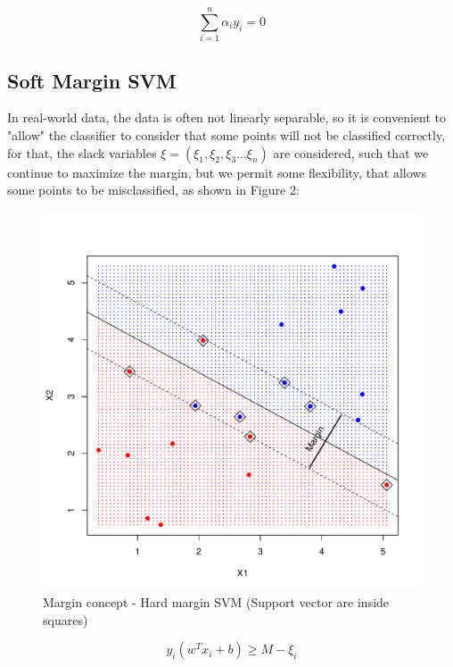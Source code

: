 \documentclass[11pt,twocolumn,letterpaper]{article}
\begin{document}
\begin{equation}
	\sum_{i=1}^{n} \alpha_i y_i = 0
\end{equation}

\subsection{Soft Margin SVM}

In real-world data, the data is often not linearly separable, so it is convenient to "allow" the classifier to consider that some points will not be classified correctly, for that, the slack variables $\xi = (\xi_1,\xi_2,\xi_3 ... \xi_n)$ are considered, such that we continue to maximize the margin, but we permit some flexibility, that allows some points to be misclassified, as shown in Figure 2:

\begin{figure}[h]
	\begin{center}
		\includegraphics[width=1.0\linewidth]{margin_sf.pdf}
	\end{center}
	\caption{Margin concept - Hard margin SVM (Support vector are inside squares)}
	\label{fig:margin_sf}
\end{figure}


\begin{equation}
	y_i(w^T x_i + b) \geq M - \xi_i 
\end{equation}
\end{document}
